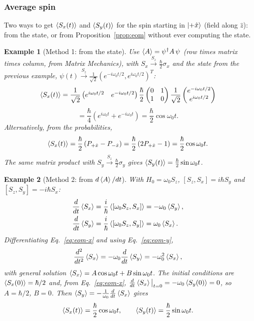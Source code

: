 \documentclass{article}
\newtheorem*{example}{Example}
\begin{document}
\subsubsection{Average spin}
Two ways to get $\braket{S_x(t)}$ and $\braket{S_y(t)}$ for the spin starting in $\ket{+\hat{x}}$ (field along $\hat{z}$): from the state, or from Proposition~\ref{prop:eom} without ever computing the state.
\begin{example}[Method 1: from the state]
    Use $\braket{A} = \psi^\dagger A\,\psi$ (row times matrix times column, from Matrix Mechanics), with $S_x \xrightarrow{S_z} \frac{\hbar}{2}\sigma_x$ and the state from the previous example, $\psi(t) \xrightarrow{S_z} \frac{1}{\sqrt{2}}\left(e^{-i\omega_0t/2}, e^{i\omega_0t/2}\right)^T$:
    \[\braket{S_x(t)} = \frac{1}{\sqrt{2}}\begin{pmatrix} e^{i\omega_0t/2} & e^{-i\omega_0t/2} \end{pmatrix}\frac{\hbar}{2}\begin{pmatrix} 0 & 1 \\ 1 & 0 \end{pmatrix}\frac{1}{\sqrt{2}}\begin{pmatrix} e^{-i\omega_0t/2} \\ e^{i\omega_0t/2} \end{pmatrix}\]
    \[= \frac{\hbar}{4}\left(e^{i\omega_0t} + e^{-i\omega_0t}\right) = \frac{\hbar}{2}\cos\omega_0t.\]
    Alternatively, from the probabilities,
    \[\braket{S_x(t)} = \frac{\hbar}{2}\left(P_{+\hat{x}} - P_{-\hat{x}}\right) = \frac{\hbar}{2}\left(2P_{+\hat{x}} - 1\right) = \frac{\hbar}{2}\cos\omega_0t.\]
    The same matrix product with $S_y \xrightarrow{S_z} \frac{\hbar}{2}\sigma_y$ gives $\braket{S_y(t)} = \frac{\hbar}{2}\sin\omega_0t$.
\end{example}
\begin{example}[Method 2: from $d\braket{A}/dt$]
With $H_0 = \omega_0S_z$, $[S_z,S_x] = i\hbar S_y$ and $[S_z,S_y] = -i\hbar S_x$:
\begin{align}
    \frac{d}{dt}\braket{S_x} &= \frac{i}{\hbar}\braket{[\omega_0S_z,S_x]} = -\omega_0\braket{S_y}, \label{eq:eom-x}\\
    \frac{d}{dt}\braket{S_y} &= \frac{i}{\hbar}\braket{[\omega_0S_z,S_y]} = \omega_0\braket{S_x}. \label{eq:eom-y}
\end{align}
Differentiating Eq.~\eqref{eq:eom-x} and using Eq.~\eqref{eq:eom-y},
\[\frac{d^2}{dt^2}\braket{S_x} = -\omega_0\frac{d}{dt}\braket{S_y} = -\omega_0^2\braket{S_x},\]
with general solution $\braket{S_x} = A\cos\omega_0t + B\sin\omega_0t$. The initial conditions are $\braket{S_x(0)} = \hbar/2$ and, from Eq.~\eqref{eq:eom-x}, $\frac{d}{dt}\braket{S_x}\big|_{t=0} = -\omega_0\braket{S_y(0)} = 0$, so $A = \hbar/2$, $B = 0$. Then $\braket{S_y} = -\frac{1}{\omega_0}\frac{d}{dt}\braket{S_x}$ gives
\[\braket{S_x(t)} = \frac{\hbar}{2}\cos\omega_0t, \qquad \braket{S_y(t)} = \frac{\hbar}{2}\sin\omega_0t.\]
\end{example}
\end{document}
